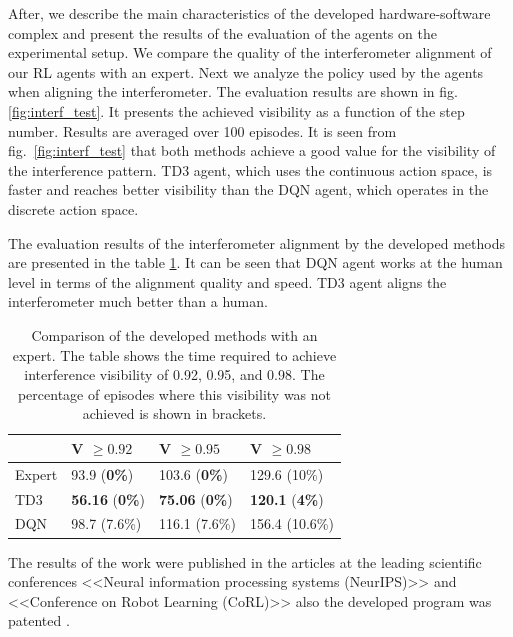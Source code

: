After, we describe the main characteristics of the developed hardware-software complex and present the results of the evaluation of the agents on the experimental setup. We compare the quality of the interferometer alignment of our RL agents with an expert. Next we analyze the policy used by the agents when aligning the interferometer. The evaluation results are shown in fig.~ \ref{fig:interf_test}. It presents the achieved visibility as a function of the step number. Results are averaged over 100 episodes. It is seen from fig.~\ref{fig:interf_test} that both methods achieve a good value for the visibility of the interference pattern. TD3 agent, which uses the continuous action space, is faster and reaches better visibility than the DQN agent, which operates in the discrete action space.

The evaluation results of the interferometer alignment by the developed methods are presented in the table \ref{tab:human}. It can be seen that DQN agent works at the human level in terms of the alignment quality and speed. TD3 agent aligns the interferometer much better than a human.

\begin{table} [htbp]
    \centering
    \begin{threeparttable}
        \caption{Comparison of the developed methods with an expert. The table shows the time required to achieve interference visibility of 0.92, 0.95, and 0.98. The percentage of episodes where this visibility was not achieved is shown in brackets.}
        \label{tab:human}
        \begin{tabular}{| p{2.5cm} || p{2.5cm} | p{2.5cm} | p{2.5cm} |}
            \hline
            \hline
            &V $\ge 0.92$ & V $\ge 0.95$ & V $\ge 0.98$\\
            \hline
            Expert &  93.9 (\textbf{0\%})  & 103.6 (\textbf{0\%}) & 129.6 (10\%)\\
            TD3 &  \textbf{56.16} (\textbf{0\%}) & \textbf{75.06} (\textbf{0\%}) & \textbf{120.1} (\textbf{4\%})\\
            DQN &  98.7 (7.6\%) & 116.1 (7.6\%) & 156.4 (10.6\%)\\
            \hline
            \hline
        \end{tabular}
    \end{threeparttable}
\end{table}

The results of the work were published in the articles \cite{confbib1, confbib2} at the leading scientific conferences <<Neural information processing systems (NeurIPS)>> and <<Conference on Robot Learning (CoRL)>> also the developed program was patented \cite{progbib1}.

